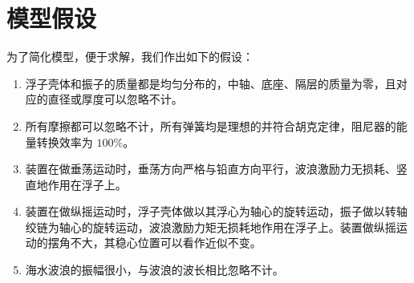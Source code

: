 \section{模型假设}

为了简化模型，便于求解，我们作出如下的假设：

\begin{enumerate}
    \item 浮子壳体和振子的质量都是均匀分布的，中轴、底座、隔层的质量为零，且对应的直径或厚度可以忽略不计。
    \item 所有摩擦都可以忽略不计，所有弹簧均是理想的并符合胡克定律，阻尼器的能量转换效率为 $100\%$。
    \item 装置在做垂荡运动时，垂荡方向严格与铅直方向平行，波浪激励力无损耗、竖直地作用在浮子上。
    \item 装置在做纵摇运动时，浮子壳体做以其浮心为轴心的旋转运动，振子做以转轴绞链为轴心的旋转运动，波浪激励力矩无损耗地作用在浮子上。装置做纵摇运动的摆角不大，其稳心位置可以看作近似不变。
    \item 海水波浪的振幅很小，与波浪的波长相比忽略不计。
\end{enumerate}